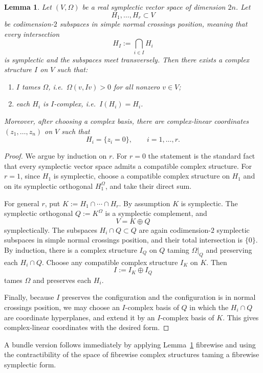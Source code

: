 \documentclass[11pt]{article}
\newtheorem{lemma}[theorem]{Lemma}
\theoremstyle{definition}
\numberwithin{equation}{section}
\begin{document}
\begin{lemma}\label{lem:linear}
Let $(V,\Omega)$ be a real symplectic vector space of dimension $2n$.  Let
\[
H_1,\dots,H_r\subset V
\]
be codimension-$2$ subspaces in simple normal crossings position, meaning that every intersection
\[
H_I:=\bigcap_{i\in I}H_i
\]
is symplectic and the subspaces meet transversely.  Then there exists a complex structure $I$ on $V$ such that:
\begin{enumerate}[label=(\alph*)]
\item $I$ tames $\Omega$, i.e.\ $\Omega(v,Iv)>0$ for all nonzero $v\in V$;
\item each $H_i$ is $I$-complex, i.e.\ $I(H_i)=H_i$.
\end{enumerate}
Moreover, after choosing a complex basis, there are complex-linear coordinates $(z_1,\dots,z_n)$ on $V$ such that
\[
H_i=\{z_i=0\},\qquad i=1,\dots,r.
\]
\end{lemma}

\begin{proof}
We argue by induction on $r$.  For $r=0$ the statement is the standard fact that every symplectic vector space admits a compatible complex structure.  For $r=1$, since $H_1$ is symplectic, choose a compatible complex structure on $H_1$ and on its symplectic orthogonal $H_1^\Omega$, and take their direct sum.

For general $r$, put $K:=H_1\cap\cdots\cap H_r$.  By assumption $K$ is symplectic.  The symplectic orthogonal $Q:=K^\Omega$ is a symplectic complement, and
\[
V=K\oplus Q
\]
symplectically.  The subspaces $H_i\cap Q\subset Q$ are again codimension-$2$ symplectic subspaces in simple normal crossings position, and their total intersection is $\{0\}$.  By induction, there is a complex structure $I_Q$ on $Q$ taming $\Omega|_Q$ and preserving each $H_i\cap Q$.  Choose any compatible complex structure $I_K$ on $K$.  Then
\[
I:=I_K\oplus I_Q
\]
tames $\Omega$ and preserves each $H_i$.

Finally, because $I$ preserves the configuration and the configuration is in normal crossings position, we may choose an $I$-complex basis of $Q$ in which the $H_i\cap Q$ are coordinate hyperplanes, and extend it by an $I$-complex basis of $K$.  This gives complex-linear coordinates with the desired form.
\end{proof}

A bundle version follows immediately by applying Lemma~\ref{lem:linear} fibrewise and using the contractibility of the space of fibrewise complex structures taming a fibrewise symplectic form.
\end{document}
